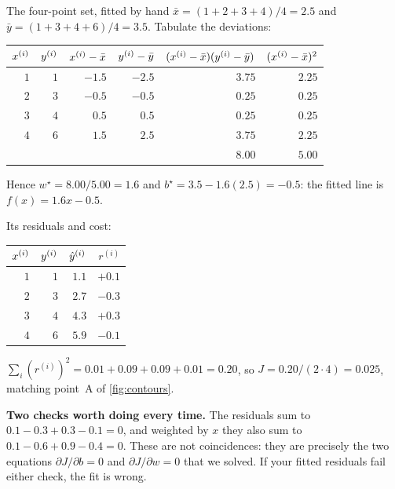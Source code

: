 \begin{workedexample}{The four-point set, fitted by hand}
$\bar x = (1+2+3+4)/4 = 2.5$ and $\bar y = (1+3+4+6)/4 = 3.5$. Tabulate the
deviations:

\begin{center}
\small
\renewcommand{\arraystretch}{1.15}
\begin{tabular}{@{}rrrrrr@{}}
\toprule
$x^{(i)}$ & $y^{(i)}$ & $x^{(i)}-\bar x$ & $y^{(i)}-\bar y$ &
$(x^{(i)}-\bar x)(y^{(i)}-\bar y)$ & $(x^{(i)}-\bar x)^2$\\
\midrule
$1$ & $1$ & $-1.5$ & $-2.5$ & $3.75$ & $2.25$\\
$2$ & $3$ & $-0.5$ & $-0.5$ & $0.25$ & $0.25$\\
$3$ & $4$ & $ 0.5$ & $ 0.5$ & $0.25$ & $0.25$\\
$4$ & $6$ & $ 1.5$ & $ 2.5$ & $3.75$ & $2.25$\\
\midrule
    &     &        &        & $\mathbf{8.00}$ & $\mathbf{5.00}$\\
\bottomrule
\end{tabular}
\end{center}

Hence $w^\star = 8.00/5.00 = 1.6$ and $b^\star = 3.5 - 1.6(2.5) = -0.5$: the
fitted line is $f(x) = 1.6x - 0.5$.

Its residuals and cost:
\begin{center}
\small
\begin{tabular}{@{}rrrr@{}}
\toprule
$x^{(i)}$ & $y^{(i)}$ & $\hat{y}^{(i)}$ & $r^{(i)}$\\
\midrule
$1$ & $1$ & $1.1$ & $+0.1$\\
$2$ & $3$ & $2.7$ & $-0.3$\\
$3$ & $4$ & $4.3$ & $+0.3$\\
$4$ & $6$ & $5.9$ & $-0.1$\\
\bottomrule
\end{tabular}
\end{center}
$\sum_i (r^{(i)})^2 = 0.01+0.09+0.09+0.01 = 0.20$, so
$J = 0.20/(2\cdot 4) = 0.025$, matching point~A of \cref{fig:contours}.

\textbf{Two checks worth doing every time.} The residuals sum to
$0.1-0.3+0.3-0.1 = 0$, and weighted by $x$ they also sum to
$0.1 - 0.6 + 0.9 - 0.4 = 0$. These are not coincidences: they are precisely the
two equations $\partial J/\partial b = 0$ and $\partial J/\partial w = 0$ that
we solved. If your fitted residuals fail either check, the fit is wrong.
\end{workedexample}


